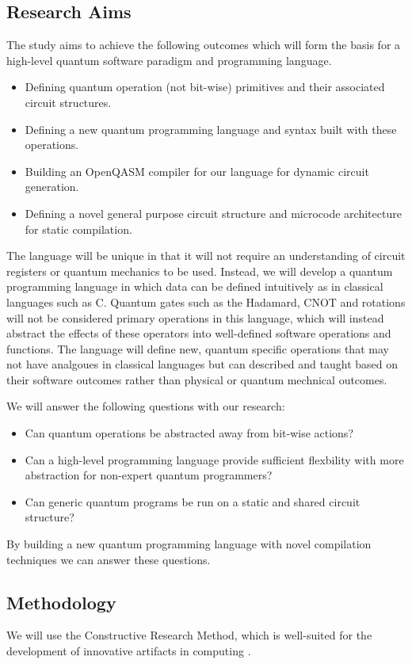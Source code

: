 \documentclass[journal,onecolumn, compsoc]{IEEEtran}
\begin{document}
\subsection{Research Aims}
The study aims to achieve the following outcomes which will form the basis for a high-level quantum software paradigm and programming language.
\begin{itemize}
    \item Defining quantum operation (not bit-wise) primitives and their associated circuit structures.
    \item Defining a new quantum programming language and syntax built with these operations.
    \item Building an OpenQASM compiler for our language for dynamic circuit generation.
    \item Defining a novel general purpose circuit structure and microcode architecture for static compilation.
\end{itemize}

The language will be unique in that it will not require an understanding of circuit registers or quantum mechanics to be used.
Instead, we will develop a quantum programming language in which data can be defined intuitively as in classical languages such as C.
Quantum gates such as the Hadamard, CNOT and rotations will not be considered primary operations in this language, which will instead abstract the effects of these operators into well-defined software operations and functions.
The language will define new, quantum specific operations that may not have analgoues in classical languages but can described and taught based on their software outcomes rather than physical or quantum mechnical outcomes.

We will answer the following questions with our research:
\begin{itemize}
    \item Can quantum operations be abstracted away from bit-wise actions?
    \item Can a high-level programming language provide sufficient flexbility with more abstraction for non-expert quantum programmers?
    \item Can generic quantum programs be run on a static and shared circuit structure?
\end{itemize}

By building a new quantum programming language with novel compilation techniques we can answer these questions.

\subsection{Methodology}
We will use the Constructive Research Method, which is well-suited for the development of innovative artifacts in computing \cite{lukka2003constructive}. 
\end{document}
